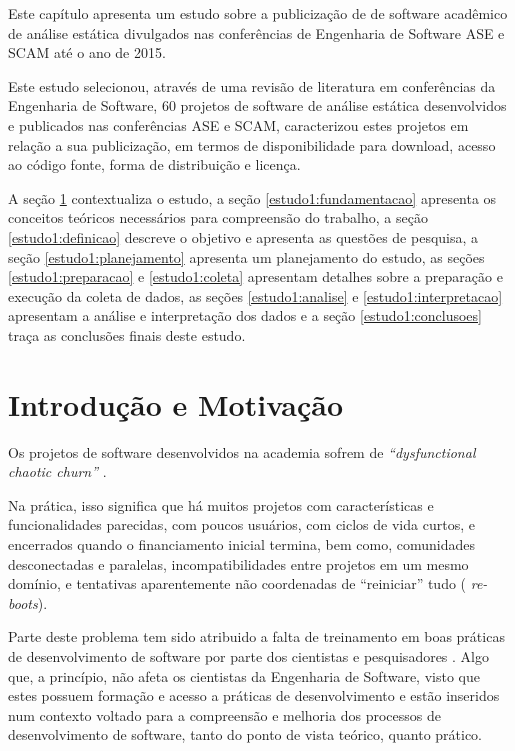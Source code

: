 {Este capítulo apresenta um estudo sobre a publicização de 
de software acadêmico de análise estática divulgados nas conferências de
Engenharia de Software ASE e SCAM até o ano de 2015.}
\label{estudo1}

Este estudo selecionou, através de uma revisão de literatura em conferências da
Engenharia de Software, 60 projetos de software de análise estática
desenvolvidos e publicados nas conferências ASE e SCAM, caracterizou estes
projetos em relação a sua publicização, em termos de disponibilidade para download, acesso ao código fonte, forma de distribuição e licença.

A seção \ref{estudo1:introducao} contextualiza o estudo,
a seção \ref{estudo1:fundamentacao} apresenta os conceitos teóricos necessários para compreensão do trabalho,
a seção \ref{estudo1:definicao} descreve o objetivo e apresenta as questões de pesquisa,
a seção \ref{estudo1:planejamento} apresenta um planejamento do estudo,
as seções \ref{estudo1:preparacao} e \ref{estudo1:coleta} apresentam detalhes sobre a preparação e execução da coleta de dados,
as seções \ref{estudo1:analise} e \ref{estudo1:interpretacao} apresentam a análise e interpretação dos dados e
a seção \ref{estudo1:conclusoes} traça as conclusões finais deste estudo.

\section{Introdução e Motivação} \label{estudo1:introducao} %

Os projetos de software desenvolvidos na academia sofrem de {\it
``dysfunctional chaotic churn''} \cite{howison2015understanding}.

Na prática, isso significa que há muitos projetos com características e
funcionalidades parecidas, com poucos usuários, com ciclos de vida curtos, e
encerrados quando o financiamento inicial termina, bem como, comunidades
desconectadas e paralelas, incompatibilidades entre projetos em um mesmo
domínio, e tentativas aparentemente não coordenadas de ``reiniciar'' tudo ({\it
re-boots}).

Parte deste problema tem sido atribuido a falta de treinamento em boas práticas
de desenvolvimento de software por parte dos cientistas e pesquisadores
\cite{wilson2017good}. Algo que, a princípio, não afeta os cientistas da
Engenharia de Software, visto que estes possuem formação e acesso a práticas de
desenvolvimento e estão inseridos num contexto voltado para a compreensão e
melhoria dos processos de desenvolvimento de software, tanto do ponto de vista
teórico, quanto prático.

